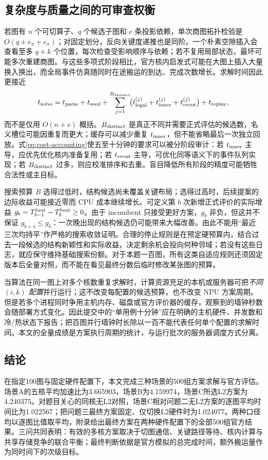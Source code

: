 \subsection{复杂度与质量之间的可审查权衡}
若图有 $n$ 个可切算子、$q$ 个候选子图和 $e$ 条投影依赖，单次商图拓扑检验是 $O(q+e_\pi+e_\sigma)$；对固定划分，反向关键度递推也是同阶。一个朴素空隙插入会查看至多 $q+k$ 个位置，每次检查受影响顺序与依赖；若不复用局部状态，最坏可能多次重建商图。与这些多项式阶段相比，官方核内启发式可能在大图上插入大量换入换出，而全局事件仿真随同时在途搬运的到达、完成次数增长。求解时间因此更接近
\begin{equation}\label{eq:cost-accounting}
t_{\rm solve}
=t_{\rm parse}+t_{\rm seed}
+\sum_{j=1}^{B_{\rm distinct}}\!
\bigl(t_{\rm legal}^{(j)}+t_{\rm inner}^{(j)}+t_{\rm event}^{(j)}\bigr)
+t_{\rm replay},
\end{equation}
而不是仅用 $O(n+e)$ 概括。$B_{\rm distinct}$ 是真正不同并需要正式评估的候选数，名义槽位可能因重复而更大；缓存可以减少重复 $t_{\rm inner}$，但不能省略最后一次独立回放。式\eqref{eq:cost-accounting}使五至十分钟的要求可以被分阶段审计：若 $t_{\rm inner}$ 主导，应优先优化核内准备复用；若 $t_{\rm event}$ 主导，可优化同等语义下的事件队列实现；若 $B_{\rm distinct}$ 过多，则应校准排序和去重。盲目降低所有阶段的精度可能牺牲合法性或主目标。

搜索预算 $B$ 选得过低时，结构候选尚未覆盖关键布局；选得过高时，后续提案的边际收益可能接近零而 CPU 成本继续增长。可定义第 $b$ 次新增正式评价的实际增益 $g_b=T_{b-1}^{\rm best}-T_b^{\rm best}\ge0$。由于 incumbent 只接受更好方案，$g_b$ 非负，但这并不保证 $g_{b+1}\le g_b$：一次晚出现的结构候选仍可能带来大幅改善。由此不能用“最近三次均持平”作严格的搜索收敛证明。合理的停止规则是在预定硬预算内，结合过去一段候选的结构新颖性和实际收益，决定剩余机会投向何种邻域；若没有这些日志，就应保守维持基础搜索份额。对于本题一百图，所有这类自适应规则还须固定版本后全量对照，而不能在看见最终分数后临时修改某张图的预算。

当算法在同一图上对多个核数重复求解时，计算资源充足的本机或服务器可把\emph{不同 $(i,k)$ 配置}并行运行；这不改变每配置的候选预算，也不改变 NPU 方案周期。但是若多个进程同时争用主机内存、磁盘或官方评价器的缓存，观察到的墙钟秒数会随部署方式变化。因此提交中的“单用例十分钟”应在明确的主机硬件、并发数和冷/热状态下报告；把百图并行墙钟时长除以一百不能代表任何单个配置的求解时间。本文的全量成绩是方案执行周期的统计，与运行批次的服务器调度方式分离。

\subsection{结论}
在指定100图与固定硬件配置下，本文完成三种场景的500组方案求解与官方评估。场景A的五核平均加速比为3.665903，场景B为4.159974，场景C所选L2方案为4.240375。对题目关心的同核无L2对照，场景C相对问题二无L2方案的逐图平均时间比为1.022567；把问题三最终方案固定、仅切换L2硬件时为1.024077。两种口径均以逐图比值取平均，附录给出最终方案在两种硬件配置下的全部500组官方结果。三问共同表明：有效的多核方案取决于切图通信、关键路径等待、核内计算与共享存储竞争的联合平衡；最终判断依据是官方模拟的总完成时间，额外搬运量作为同时间下的次级目标。
